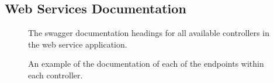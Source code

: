 \documentclass[a4paper,11pt]{report}
\begin{document}
\begin{appendix}
    \chapter{Web Services Documentation}
    \label{appendix:webservices}
    \begin{figure}[H]
        \centering
        \caption{The swagger documentation headings for all available controllers in the web service application.}
        \label{fig:swaggerList}
    \end{figure}
    \begin{figure}[H]
        \centering
        \caption{An example of the documentation of each of the endpoints within each controller.}
        \label{fig:endpointDocs}
    \end{figure}
    \begin{figure}[H]
        \centering

\end{figure}
\end{appendix}
\end{document}
